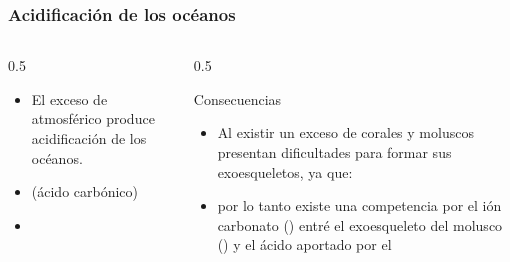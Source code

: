 \documentclass[11pt, aspectratio=169, xcolor=table]{beamer}
\begin{document}
\begin{frame}
  \frametitle{Acidificación de los océanos}
  \begin{columns}
    \begin{column}{0.5\textwidth}
      \begin{itemize}
        \item El exceso de  atmosférico produce acidificación de los océanos.
        \item {} (ácido carbónico)
        \item {}
      \end{itemize}
    \end{column}
    \begin{column}{0.5\textwidth}
      \begin{alertblock}{Consecuencias}
        \begin{itemize}
          \item Al existir un exceso de  corales y moluscos presentan dificultades para formar sus exoesqueletos, ya que:
          \item {} por lo tanto existe una competencia por el ión carbonato () entré el exoesqueleto del molusco () y el ácido aportado por el 
        \end{itemize}
      \end{alertblock}
    \end{column}
  \end{columns}
\end{frame}
\end{document}
